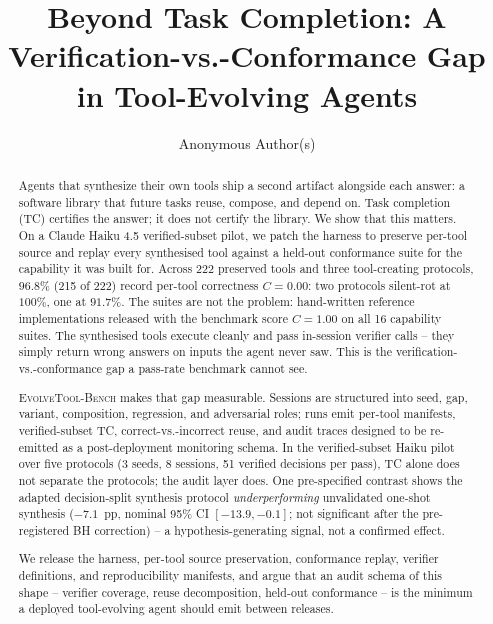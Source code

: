 \documentclass[sigconf,anonymous,natbib=false]{acmart}
\begin{document}
\title{Beyond Task Completion: A Verification-vs.-Conformance Gap in Tool-Evolving Agents}

\author{Anonymous Author(s)}

\begin{abstract}
Agents that synthesize their own tools ship a second artifact alongside each answer: a software library that future tasks reuse, compose, and depend on. Task completion (TC) certifies the answer; it does not certify the library. We show that this matters. On a Claude Haiku 4.5 verified-subset pilot, we patch the harness to preserve per-tool source and replay every synthesised tool against a held-out conformance suite for the capability it was built for. Across 222 preserved tools and three tool-creating protocols, $96.8\%$ (215 of 222) record per-tool correctness $C{=}0.00$: two protocols silent-rot at $100\%$, one at $91.7\%$. The suites are not the problem: hand-written reference implementations released with the benchmark score $C{=}1.00$ on all 16 capability suites. The synthesised tools execute cleanly and pass in-session verifier calls -- they simply return wrong answers on inputs the agent never saw. This is the verification-vs.-conformance gap a pass-rate benchmark cannot see.

\textsc{EvolveTool-Bench} makes that gap measurable. Sessions are structured into seed, gap, variant, composition, regression, and adversarial roles; runs emit per-tool manifests, verified-subset TC, correct-vs.-incorrect reuse, and audit traces designed to be re-emitted as a post-deployment monitoring schema. In the verified-subset Haiku pilot over five protocols (3 seeds, 8 sessions, 51 verified decisions per pass), TC alone does not separate the protocols; the audit layer does. One pre-specified contrast shows the adapted decision-split synthesis protocol \emph{underperforming} unvalidated one-shot synthesis ($-7.1$~pp, nominal 95\% CI $[-13.9,-0.1]$; not significant after the pre-registered BH correction) -- a hypothesis-generating signal, not a confirmed effect.

We release the harness, per-tool source preservation, conformance replay, verifier definitions, and reproducibility manifests, and argue that an audit schema of this shape -- verifier coverage, reuse decomposition, held-out conformance -- is the minimum a deployed tool-evolving agent should emit between releases.
\end{abstract}
\end{document}

